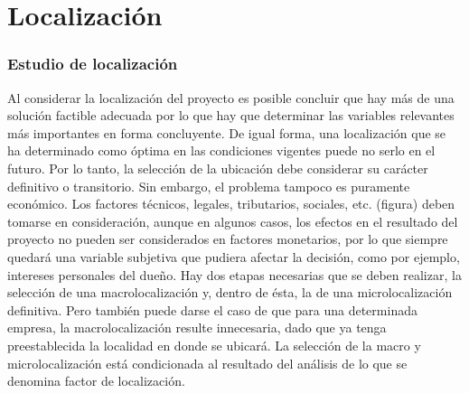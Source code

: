 \documentclass[../main]{subfiles}
\begin{document}
\chapter{Localización}
\subsection{Estudio de localización}
Al considerar la localización del proyecto es posible concluir que
hay más de una
solución factible adecuada por lo que hay que determinar las
variables relevantes
más importantes en forma concluyente. De igual forma, una localización que se ha
determinado como óptima en las condiciones vigentes puede no serlo en el futuro.
Por lo tanto, la selección de la ubicación debe considerar su
carácter definitivo o
transitorio.
Sin embargo, el problema tampoco es puramente económico. Los factores
técnicos, legales, tributarios, sociales, etc. (figura) deben tomarse en
consideración, aunque en algunos casos, los efectos en el resultado
del proyecto no pueden ser considerados en factores monetarios, por
lo que siempre quedará una variable subjetiva que pudiera afectar la
decisión, como por ejemplo, intereses
personales del dueño.
Hay dos etapas necesarias que se deben realizar, la selección de una
macrolocalización y, dentro de ésta, la de una microlocalización definitiva.
Pero también puede darse el caso de que para una determinada empresa,
la macrolocalización resulte innecesaria, dado que ya tenga preestablecida la
localidad en donde se ubicará. La selección de la macro y
microlocalización está condicionada al resultado del análisis de lo
que se denomina factor de localización.
\end{document}
